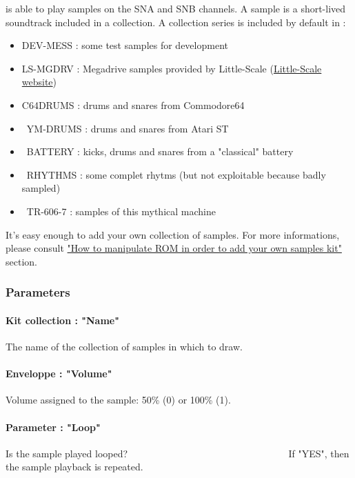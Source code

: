 \FAT is able to play samples on the SNA and SNB channels.
A sample is a short-lived soundtrack included in a collection.
A collection series is included by default in \FAT : \medskip

\begin{itemize}
    \item {DEV-MESS : some test samples for development}
    \item {LS-MGDRV : Megadrive samples provided by Little-Scale (\href{http://little-scale.blogspot.fr/2008/08/sega-mega-drive-sample-pack.html}{Little-Scale website})}
    \item {C64DRUMS : drums and snares from Commodore64}
    \item {YM-DRUMS : drums and snares from Atari ST}
    \item {BATTERY : kicks, drums and snares from a "classical" battery}
    \item {RHYTHMS : some complet rhytms (but not exploitable because badly sampled)}
    \item {TR-606-7 : samples of this mythical machine}
\end{itemize} \medskip

It's easy enough to add your own collection of samples. For more informations, please consult \hyperref[sec:addsamples]{"How to manipulate ROM in order to add your own samples kit"} section.


\subsubsection{Parameters}

\paragraph{Kit collection : "Name"} The name of the collection of samples in which to draw.

\paragraph{Enveloppe : "Volume"} Volume assigned to the sample: 50\% (0) or 100\% (1).

\paragraph{Parameter : "Loop"} Is the sample played looped?
                                 If "YES", then the sample playback is repeated.

